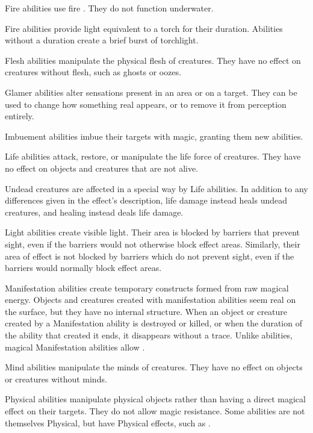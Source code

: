      Fire abilities use fire . They do not function underwater.
    \par Fire abilities provide light equivalent to a torch for their duration.
    Abilities without a duration create a brief burst of torchlight.

     Flesh abilities manipulate the physical flesh of creatures.
    They have no effect on creatures without flesh, such as ghosts or oozes.

     Glamer abilities alter sensations present in an area or on a target.
    They can be used to change how something real appears, or to remove it from perception entirely.

     Imbuement abilities imbue their targets with magic, granting them new abilities.

     Life abilities attack, restore, or manipulate the life force of creatures.
    They have no effect on objects and creatures that are not alive.
    \par Undead creatures are affected in a special way by Life abilities.
    In addition to any differences given in the effect's description, life damage instead heals undead creatures, and healing instead deals life damage.

     Light abilities create visible light.
    Their area is blocked by barriers that prevent sight, even if the barriers would not otherwise block effect areas.
    Similarly, their area of effect is not blocked by barriers which do not prevent sight, even if the barriers would normally block effect areas.

     Manifestation abilities create temporary constructs formed from raw magical energy.
    Objects and creatures created with manifestation abilities seem real on the surface, but they have no internal structure.
    When an object or creature created by a Manifestation ability is destroyed or killed, or when the duration of the ability that created it ends, it disappears without a trace.
    Unlike  abilities, magical Manifestation abilities allow .

     Mind abilities manipulate the minds of creatures.
    They have no effect on objects or creatures without minds.

     Physical abilities manipulate physical objects rather than having a direct magical effect on their targets.
    They do not allow magic resistance.
    Some abilities are not themselves Physical, but have Physical effects, such as .

